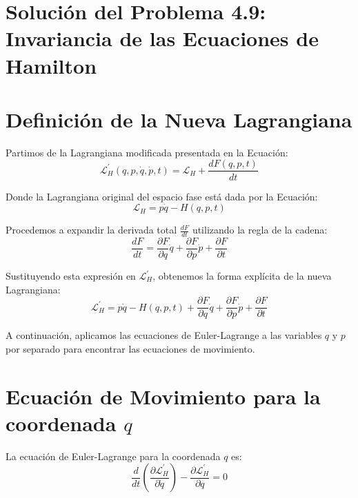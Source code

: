 \documentclass[12pt, a4paper]{article}
\begin{document}
\section{Solución del Problema 4.9: Invariancia de las Ecuaciones de Hamilton}


\section*{Definición de la Nueva Lagrangiana}

Partimos de la Lagrangiana modificada presentada en la Ecuación:
\begin{equation}
    \mathcal{L}_{H}^{\prime}(q, p, \dot{q}, \dot{p}, t) = \mathcal{L}_{H} + \frac{dF(q, p, t)}{dt}
    \label{eq:LH_prime}
\end{equation}

Donde la Lagrangiana original del espacio fase está dada por la Ecuación:
\begin{equation}
    \mathcal{L}_{H} = p\dot{q} - H(q, p, t)
\end{equation}

Procedemos a expandir la derivada total $\frac{dF}{dt}$ utilizando la regla de la cadena:
\begin{equation}
    \frac{dF}{dt} = \frac{\partial F}{\partial q}\dot{q} + \frac{\partial F}{\partial p}\dot{p} + \frac{\partial F}{\partial t}
\end{equation}

Sustituyendo esta expresión en $\mathcal{L}_{H}^{\prime}$, obtenemos la forma explícita de la nueva Lagrangiana:
\begin{equation}
    \mathcal{L}_{H}^{\prime} = p\dot{q} - H(q, p, t) + \frac{\partial F}{\partial q}\dot{q} + \frac{\partial F}{\partial p}\dot{p} + \frac{\partial F}{\partial t}
\end{equation}

A continuación, aplicamos las ecuaciones de Euler-Lagrange a las variables $q$ y $p$ por separado para encontrar las ecuaciones de movimiento.

\section*{Ecuación de Movimiento para la coordenada $q$}

La ecuación de Euler-Lagrange para la coordenada $q$ es:
\begin{equation}
    \frac{d}{dt}\left( \frac{\partial \mathcal{L}_{H}^{\prime}}{\partial \dot{q}} \right) - \frac{\partial \mathcal{L}_{H}^{\prime}}{\partial q} = 0
\end{equation}
\end{document}
